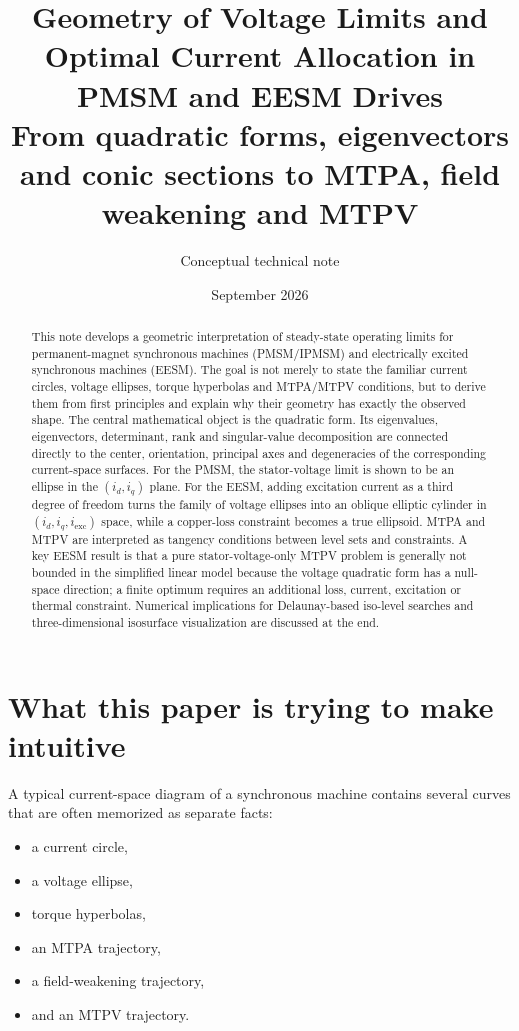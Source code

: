 \documentclass[11pt,a4paper]{article}
\title{\textbf{Geometry of Voltage Limits and Optimal Current Allocation in PMSM and EESM Drives}\\[0.4em]
\large From quadratic forms, eigenvectors and conic sections to MTPA, field weakening and MTPV}
\author{Conceptual technical note}
\date{September 2026}
\begin{document}
\maketitle

\begin{abstract}
This note develops a geometric interpretation of steady-state operating limits for permanent-magnet synchronous machines (PMSM/IPMSM) and electrically excited synchronous machines (EESM). The goal is not merely to state the familiar current circles, voltage ellipses, torque hyperbolas and MTPA/MTPV conditions, but to derive them from first principles and explain why their geometry has exactly the observed shape. The central mathematical object is the quadratic form. Its eigenvalues, eigenvectors, determinant, rank and singular-value decomposition are connected directly to the center, orientation, principal axes and degeneracies of the corresponding current-space surfaces. For the PMSM, the stator-voltage limit is shown to be an ellipse in the $(i_d,i_q)$ plane. For the EESM, adding excitation current as a third degree of freedom turns the family of voltage ellipses into an oblique elliptic cylinder in $(i_d,i_q,i_{\mathrm{exc}})$ space, while a copper-loss constraint becomes a true ellipsoid. MTPA and MTPV are interpreted as tangency conditions between level sets and constraints. A key EESM result is that a pure stator-voltage-only MTPV problem is generally not bounded in the simplified linear model because the voltage quadratic form has a null-space direction; a finite optimum requires an additional loss, current, excitation or thermal constraint. Numerical implications for Delaunay-based iso-level searches and three-dimensional isosurface visualization are discussed at the end.
\end{abstract}

\tableofcontents
\newpage

\section{What this paper is trying to make intuitive}

A typical current-space diagram of a synchronous machine contains several curves that are often memorized as separate facts:

\begin{itemize}
  \item a current circle,
  \item a voltage ellipse,
  \item torque hyperbolas,
  \item an MTPA trajectory,
  \item a field-weakening trajectory,
  \item and an MTPV trajectory.
\end{itemize}
\end{document}

